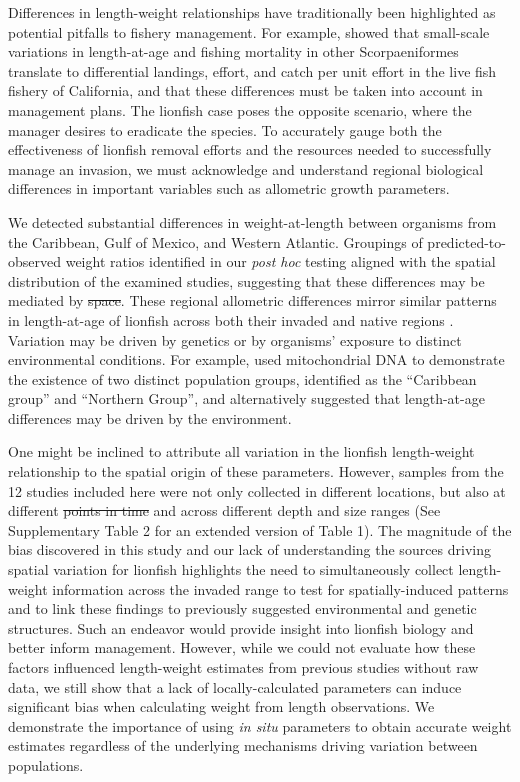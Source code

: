 \documentclass[fleqn,10pt,lineno]{wlpeerj} %
\providecommand{\DIFadd}[1]{{\protect\color{blue}\uwave{#1}}} %
\providecommand{\DIFdel}[1]{{\protect\color{red}\sout{#1}}}                      %
\providecommand{\DIFaddbegin}{} %
\providecommand{\DIFaddend}{} %
\providecommand{\DIFdelbegin}{} %
\providecommand{\DIFdelend}{} %
\begin{document}
Differences in length-weight relationships have traditionally been
highlighted as potential pitfalls to fishery management. For example,
\citet{wilson_2012} showed that small-scale variations in length-at-age
and fishing mortality in other Scorpaeniformes translate to differential
landings, effort, and catch per unit effort in the live fish fishery of
California, and that these differences must be taken into account in
management plans. The lionfish case poses the opposite scenario, where
the manager desires to eradicate the species. To accurately gauge both
the effectiveness of lionfish removal efforts and the resources needed
to successfully manage an invasion, we must acknowledge and understand
regional biological differences in important variables such as
allometric growth parameters.

We detected substantial differences in weight-at-length between
organisms from the Caribbean, Gulf of Mexico, and Western Atlantic.
Groupings of predicted-to-observed weight ratios identified in our
\emph{post hoc} testing aligned with the spatial distribution of the
examined studies, suggesting that these differences may be mediated by
\DIFdelbegin \DIFdel{space}\DIFdelend \DIFaddbegin \DIFadd{location}\DIFaddend . These regional allometric differences mirror similar patterns in
length-at-age of lionfish across both their invaded and native regions
\citep{pusack_2016}. Variation may be driven by genetics or by
organisms' exposure to distinct environmental conditions. For example,
\citet{betancurr_2011} used mitochondrial DNA to demonstrate the
existence of two distinct population groups, identified as the
``Caribbean group'' and ``Northern Group'', and \citet{fogg_2015}
alternatively suggested that length-at-age differences may be driven by
the environment.

One might be inclined to attribute all variation in the lionfish
length-weight relationship to the spatial origin of these parameters.
However, samples from the 12 studies included here were not only
collected in different locations, but also at different \DIFdelbegin \DIFdel{points in time
}\DIFdelend \DIFaddbegin \DIFadd{times of the year
}\DIFaddend and across different depth and size ranges (See Supplementary Table 2
for an extended version of Table 1). The magnitude of the bias
discovered in this study and our lack of understanding the sources
driving spatial variation for lionfish highlights the need to
simultaneously collect length-weight information across the invaded
range to test for spatially-induced patterns and to link these findings
to previously suggested environmental and genetic structures. Such an
endeavor would provide insight into lionfish biology and better inform
management. However, while we could not evaluate how these factors
influenced length-weight estimates from previous studies without raw
data, we still show that a lack of locally-calculated parameters can
induce significant bias when calculating weight from length
observations. We demonstrate the importance of using \emph{in situ}
parameters to obtain accurate weight estimates regardless of the
underlying mechanisms driving variation between populations.
\end{document}
